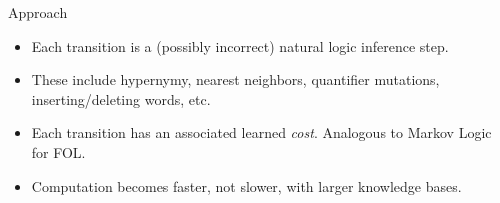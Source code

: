 \begin{block}{Approach}
  \vspace{5mm}
  \begin{center}
    \teaserFullDerivationPoster
  \end{center}

  \begin{itemize}
    \item Each transition is a (possibly incorrect) natural logic
          inference step.
    \item These include hypernymy, nearest neighbors, quantifier
          mutations, inserting/deleting words, etc.
    \item Each transition has an associated learned \textit{cost}.
          Analogous to Markov Logic for FOL.
    \item Computation becomes faster, not slower, with larger
          knowledge bases.
  \end{itemize}
\end{block}
